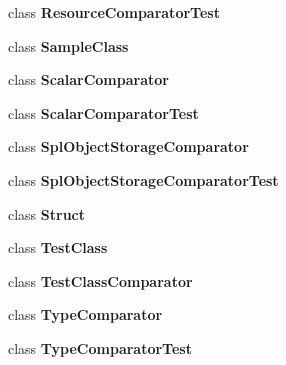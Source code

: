 \begin{DoxyCompactItemize}
class {\bf Resource\+Comparator\+Test}
\item 
class {\bf Sample\+Class}
\item 
class {\bf Scalar\+Comparator}
\item 
class {\bf Scalar\+Comparator\+Test}
\item 
class {\bf Spl\+Object\+Storage\+Comparator}
\item 
class {\bf Spl\+Object\+Storage\+Comparator\+Test}
\item 
class {\bf Struct}
\item 
class {\bf Test\+Class}
\item 
class {\bf Test\+Class\+Comparator}
\item 
class {\bf Type\+Comparator}
\item 
class {\bf Type\+Comparator\+Test}
\end{DoxyCompactItemize}
